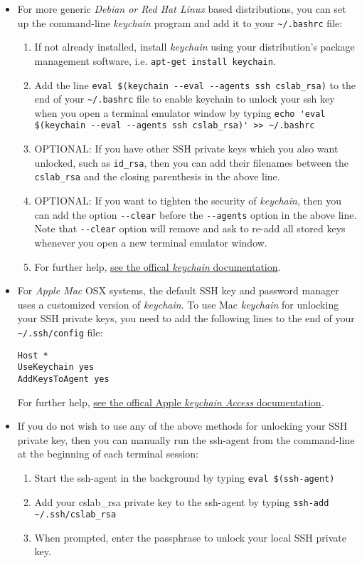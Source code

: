 \documentclass[12pt]{article}
\begin{document}
\begin{flushleft}
\begin{itemize}
  \item For more generic \textit{Debian or Red Hat Linux} based distributions, you can set up the command-line \textit{keychain} program and add it to your \verb|~/.bashrc| file:
  \begin{enumerate}
    \item If not already installed, install \textit{keychain} using your distribution's package management software, i.e. \verb|apt-get install keychain|.
    \item Add the line \verb|eval $(keychain --eval --agents ssh cslab_rsa)| to the end of your \verb|~/.bashrc| file to enable keychain to unlock your ssh key when you open a terminal emulator window by typing
      \verb|echo 'eval $(keychain --eval --agents ssh cslab_rsa)' >> ~/.bashrc|
    \item OPTIONAL: If you have other SSH private keys which you also want unlocked, such as \verb|id_rsa|, then you can add their filenames between the \verb|cslab_rsa| and the closing parenthesis in the above line.
    \item OPTIONAL: If you want to tighten the security of \textit{keychain}, then you can add the option \verb|--clear| before the \verb|--agents| option in the above line. Note that \verb|--clear| option will remove and ask to re-add all stored keys whenever you open a new terminal emulator window.
    \item For further help, \href{https://www.funtoo.org/Keychain}{see the offical \textit{keychain} documentation}.
  \end{enumerate}

\newpage
  \item For \textit{Apple Mac} OSX systems, the default SSH key and password manager uses a customized version of \textit{keychain}. To use Mac \textit{keychain} for unlocking your SSH private keys, you need to add the following lines to the end of your \verb|~/.ssh/config| file:
\begin{verbatim}
Host *
UseKeychain yes
AddKeysToAgent yes
\end{verbatim}
  For further help, \href{https://support.apple.com/guide/keychain-access/welcome/mac}{see the offical Apple \textit{keychain Access} documentation}.

  \item If you do not wish to use any of the above methods for unlocking your SSH private key, then you can manually run the ssh-agent from the command-line at the beginning of each terminal session:
  \begin{enumerate}
    \item Start the ssh-agent in the background by typing\break
      \verb|eval $(ssh-agent)|
    \item Add your cslab\_rsa private key to the ssh-agent by typing \break
      \verb|ssh-add ~/.ssh/cslab_rsa|
    \item When prompted, enter the passphrase to unlock your local SSH private key.
  \end{enumerate}


\end{itemize}
\end{flushleft}
\end{document}
